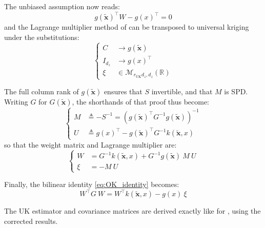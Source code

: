 The unbiased assumption now reads:
\begin{equation}
	g(\tilde{\mathbf{x}})^\top W-g(x)^\top=0
\end{equation}
and the Lagrange multiplier method of  can be transposed to universal kriging under the substitutions:
\begin{equation}
	\left\{\begin{aligned}
	C&\longrightarrow g(\tilde{\mathbf{x}})\\
	I_{d_z}&\longrightarrow g(x)^\top\\
	\xi&\in\mathcal{M}_{r_{\mathrm{UK}}d_z,d_z}(\mathbb{R})
	\end{aligned}\right.
\end{equation}

The full column rank of $g(\tilde{\mathbf{x}})$ ensures that $S$ invertible, and that $M$ is SPD. Writing $G$ for $G(\tilde{\mathbf{x}})$, the shorthands of that proof thus become:
\begin{equation}
	\left\{\begin{aligned}
	M&\triangleq-S^{-1}=\left(g(\tilde{\mathbf{x}})^\top G^{-1}g(\tilde{\mathbf{x}})\right)^{-1}\\
	U&\triangleq g(x)^\top-g(\tilde{\mathbf{x}})^\top G^{-1}k(\tilde{\mathbf{x}},x)
	\end{aligned}\right.
\end{equation}
so that the weight matrix and Lagrange multiplier are:
\begin{equation}
	\left\{\begin{aligned}
	W&=G^{-1}k(\tilde{\mathbf{x}},x)+G^{-1}g(\tilde{\mathbf{x}})\:M\:U\\
	\xi&=-M\:U
	\end{aligned}\right.
\end{equation}

Finally, the bilinear identity \eqref{eq:OK_identity} becomes:
\begin{equation}
	W^\top G\:W=W^\top k(\tilde{\mathbf{x}},x)-g(x)\:\xi
\end{equation}

The UK estimator and covariance matrices are derived exactly like for , using the corrected results.


